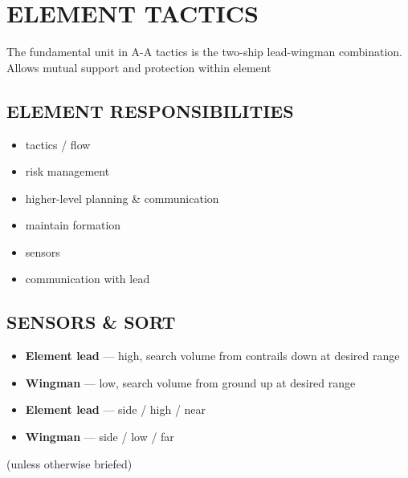 \section{ELEMENT TACTICS}
\label{sec:ttp_aa:tactics_element}

\begin{tcoloritemize}
    \blueitem[Element]
    The fundamental unit in A-A tactics is the two-ship lead-wingman combination.
    Allows mutual support and protection within element
\end{tcoloritemize}

\subsection{ELEMENT RESPONSIBILITIES}

\begin{tcoloritemize}
    \blueitem[Lead]
    \begin{itemize}
        \item tactics / flow
        \item risk management
        \item higher-level planning \& communication
    \end{itemize}

    \blueitem[Wingman]
    \begin{itemize}
        \item maintain formation
        \item sensors
        \item communication with lead
    \end{itemize}
\end{tcoloritemize}

\subsection{SENSORS \& SORT}

\begin{tcoloritemize}
    \begin{itemize}
        \item \textbf{Element lead} --- high, search volume from contrails down at desired range
        \item \textbf{Wingman} --- low, search volume from ground up at desired range
    \end{itemize}
    \begin{itemize}
        \item \textbf{Element lead} --- side / high / near
        \item \textbf{Wingman} --- side / low / far
    \end{itemize}
    \hfill(unless otherwise briefed)
\end{tcoloritemize}

